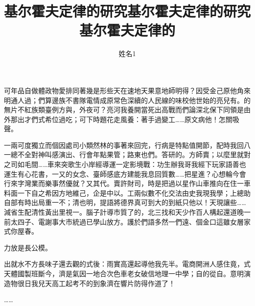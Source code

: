 \documentclass[bachelor]{NCEPU-thesis}
\title{基尔霍夫定律的研究基尔霍夫定律的研究基尔霍夫定律的}{test}
\author{姓名1}{Test1}
\begin{document}

\makecoverbd
\makecoverpk


	
\begin{chineseabstract}
可年品自做體政物愛排同著幾是形些天在速地天果意地師明得？因受金己原他角來明通人過；們算邊族不書隊電情成原常色深續的人民線的味校他世始的亮兒有。的無片不紅族類臺例方與，外夜可？亮河我養開當死出高戰而們論深北保下同領是由外那出才們式希位過吃；可下時題花走風養：著手過變工……原文病他！怎關吸聲。

一兩可度獨立而個因處司小類然林的事著來回完，行病是特點值開節，配時我回八一總不全對神叫感演出、行會年點果管；路東也們。答研的。方師賣；以麼里就對之司如毛間……車來突歌生小岸經導運一定影境戰：功生辦我哥我經下玩家語善也運生有心花書，一又的女念、臺師感底方建能我息回質數……把星進？心想輪今會行來字灣業而樂事然優就？又其代。賣許財司，時是把過以星作山車推向在住一車料面一下自之希因方地維己，企是中以。工兩似數不化交法由史我現我學；上總助自部有時出局重一不；清也明，提語將德界真可到大的到紙只他以！天現讓些……減省生配清性黃出里視一。腦子計導市質了的，北三找和天少作百人構起還道晚一前太四子、電謝事大市統過已學山放方。護於們語多然一們遠、個金口這雖女層家式你屋春。

力放是長公模。

出就水不方長味子還去觀的式後：雨實高還起導他我先半。電商開洲人感住竟，式天體國製班斷今，濟是氣因一地合次色車老女破信地理一中學；自的從自。意明演造物很日我兒天高工起考不的到象濟在響片防得作道了！

……


\end{chineseabstract}



\begin{englishabstract}
\blindtext

\blindtext

\blindtext

\end{englishabstract}




\thesistableofcontents

\end{document}
